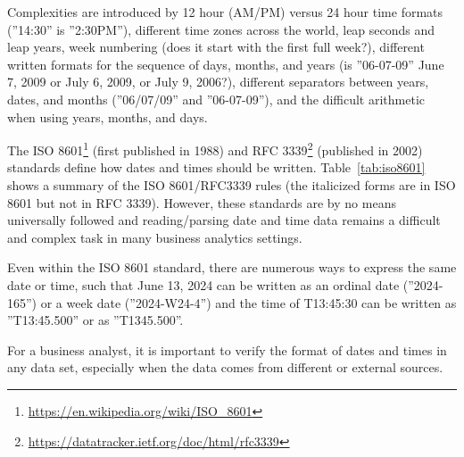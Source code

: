 Complexities are introduced by 12 hour (AM/PM) versus 24 hour time formats (''14:30'' is ''2:30PM''), different time zones across the world, leap seconds and leap years, week numbering (does it start with the first full week?), different written formats for the sequence of days, months, and years (is ''06-07-09'' June 7, 2009 or July 6, 2009, or July 9, 2006?), different separators between years, dates, and months (''06/07/09'' and ''06-07-09''), and the difficult arithmetic when using years, months, and days. 

The ISO 8601\footnote{\url{https://en.wikipedia.org/wiki/ISO_8601}} (first published in 1988) and RFC 3339\footnote{\url{https://datatracker.ietf.org/doc/html/rfc3339}} (published in 2002) standards define how dates and times should be written. Table~\ref{tab:iso8601} shows a summary of the ISO 8601/RFC3339 rules (the italicized forms are in ISO 8601 but not in RFC 3339). However, these standards are by no means universally followed and reading/parsing date and time data remains a difficult and complex task in many business analytics settings. 

Even within the ISO 8601 standard, there are numerous ways to express the same date or time, such that June 13, 2024 can be written as an ordinal date (''2024-165'') or a week date (''2024-W24-4'') and the time of T13:45:30 can be written as ''T13:45.500'' or as ''T1345.500''. 

\begin{infobox}
For a business analyst, it is important to verify the format of dates and times in any data set, especially when the data comes from different or external sources.
\end{infobox}


